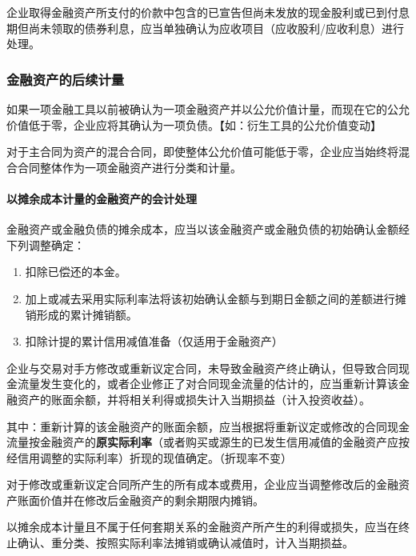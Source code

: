 \documentclass[UTF8,12pt]{ctexart}
\numberwithin{equation}{section} %
\numberwithin{figure}{section}
\numberwithin{table}{section}
\begin{document}
	企业取得金融资产所支付的价款中包含的已宣告但尚未发放的现金股利或已到付息期但尚未领取的债券利息，应当单独确认为应收项目（应收股利/应收利息）进行处理。
	
	\subsubsection{金融资产的后续计量}
	如果一项金融工具以前被确认为一项金融资产并以公允价值计量，而现在它的公允价值低于零，企业应将其确认为一项负债。【如：衍生工具的公允价值变动】
	
	对于主合同为资产的混合合同，即使整体公允价值可能低于零，企业应当始终将混合合同整体作为一项金融资产进行分类和计量。
	
	\paragraph{以摊余成本计量的金融资产的会计处理}
	金融资产或金融负债的摊余成本，应当以该金融资产或金融负债的初始确认金额经下列调整确定：
	\begin{enumerate}
		\item 扣除已偿还的本金。
		
		\item 加上或减去采用实际利率法将该初始确认金额与到期日金额之间的差额进行摊销形成的累计摊销额。
		
		\item 扣除计提的累计信用减值准备（仅适用于金融资产）
	\end{enumerate}
	
	企业与交易对手方修改或重新议定合同，未导致金融资产终止确认，但导致合同现金流量发生变化的，或者企业修正了对合同现金流量的估计的，应当重新计算该金融资产的账面余额，并将相关利得或损失计入当期损益（计入投资收益）。

	其中：重新计算的该金融资产的账面余额，应当根据将重新议定或修改的合同现金流量按金融资产的\textbf{原实际利率}（或者购买或源生的已发生信用减值的金融资产应按经信用调整的实际利率）折现的现值确定。（折现率不变）
		
	对于修改或重新议定合同所产生的所有成本或费用，企业应当调整修改后的金融资产账面价值并在修改后金融资产的剩余期限内摊销。

	
	以摊余成本计量且不属于任何套期关系的金融资产所产生的利得或损失，应当在终止确认、重分类、按照实际利率法摊销或确认减值时，计入当期损益。
	
\end{document}

